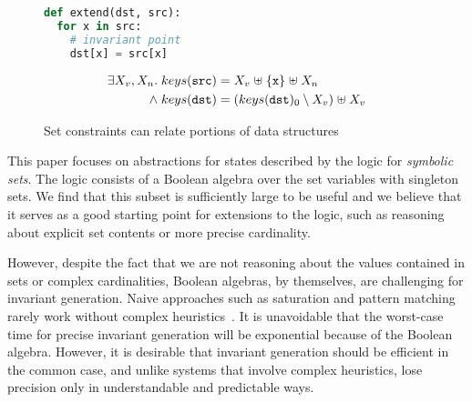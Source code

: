 \begin{figure}[tb]
  \newbox\exprogbox
  \begin{lrbox}{\exprogbox}
    \begin{minipage}[t][1cm][b]{0.4\textwidth}
      \begin{lstlisting}[language=python]
def extend(dst, src):
  for x in src:
    # invariant point
    dst[x] = src[x]
      \end{lstlisting}
    \end{minipage}
  \end{lrbox}
  \newbox\exproginv
  \begin{lrbox}{\exproginv}
    \begin{minipage}[t][0.9cm][b]{0.4\textwidth}
      \begin{align*}
        \exists X_v, X_n. \; keys(\texttt{src})
        & = X_v \mathrel{\uplus} \{\texttt{x}\} \mathrel{\uplus} X_n
        \\
        {} \mathrel{\wedge} keys(\texttt{dst})
        & = (keys(\texttt{dst})_0 \setminus X_v) \mathrel{\uplus} X_v
      \end{align*}
    \end{minipage}
  \end{lrbox}
  \centering
  \quad
  \caption{Set constraints can relate portions of data structures}
  \label{fig:intro-example}
\end{figure}

This paper focuses on abstractions for states described by the logic for \emph{symbolic sets}.  The logic consists of a Boolean algebra over the set variables with singleton sets. We find that this subset is sufficiently large to be useful and we
believe that it serves as a good starting point for extensions to the
logic, such as reasoning about explicit set contents or more precise
cardinality.

However, despite the fact that we are not reasoning about the values contained in sets or complex cardinalities, Boolean algebras, by themselves, are challenging for invariant generation.  Naive approaches such as saturation and pattern matching rarely work without complex heuristics~\cite{fixbag:cav:11,ab:ecoop:13}.  It is unavoidable that the worst-case time for precise invariant generation will be exponential because of the Boolean algebra. However, it is desirable that invariant generation should be efficient in the common case, and unlike systems that involve complex heuristics, lose precision only in understandable and predictable ways.


